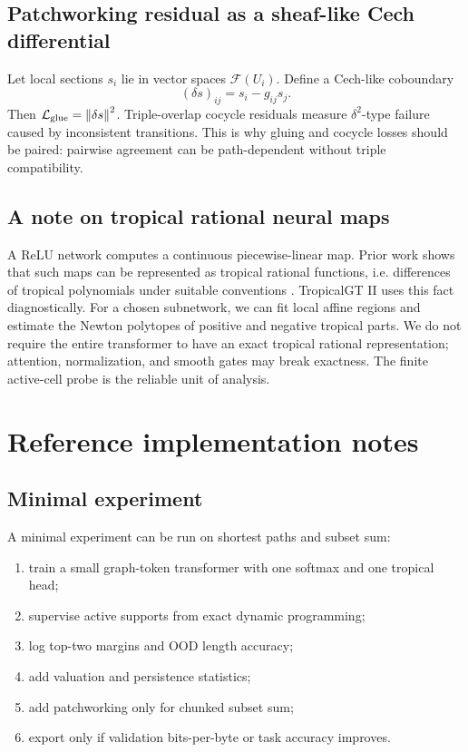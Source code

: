 \documentclass[11pt]{article}
\newcommand{\calF}{\mathcal{F}}
\newcommand{\calL}{\mathcal{L}}
\newcommand{\norm}[1]{\left\lVert #1\right\rVert}
\begin{document}
\subsection{Patchworking residual as a sheaf-like Cech differential}

Let local sections \(s_i\) lie in vector spaces \(\calF(U_i)\).  Define a Cech-like coboundary
\begin{equation}
(\delta s)_{ij}=s_i-g_{ij}s_j.
\end{equation}
Then \(\calL_{\rm glue}=\norm{\delta s}^2\).  Triple-overlap cocycle residuals measure \(\delta^2\)-type failure caused by inconsistent transitions.  This is why gluing and cocycle losses should be paired: pairwise agreement can be path-dependent without triple compatibility.

\subsection{A note on tropical rational neural maps}

A ReLU network computes a continuous piecewise-linear map.  Prior work shows that such maps can be represented as tropical rational functions, i.e. differences of tropical polynomials under suitable conventions \cite{zhang2018tropical}.  TropicalGT II uses this fact diagnostically.  For a chosen subnetwork, we can fit local affine regions and estimate the Newton polytopes of positive and negative tropical parts.  We do not require the entire transformer to have an exact tropical rational representation; attention, normalization, and smooth gates may break exactness.  The finite active-cell probe is the reliable unit of analysis.

\section{Reference implementation notes}

\subsection{Minimal experiment}

A minimal experiment can be run on shortest paths and subset sum:
\begin{enumerate}
\item train a small graph-token transformer with one softmax and one tropical head;
\item supervise active supports from exact dynamic programming;
\item log top-two margins and OOD length accuracy;
\item add valuation and persistence statistics;
\item add patchworking only for chunked subset sum;
\item export only if validation bits-per-byte or task accuracy improves.
\end{enumerate}
\end{document}
